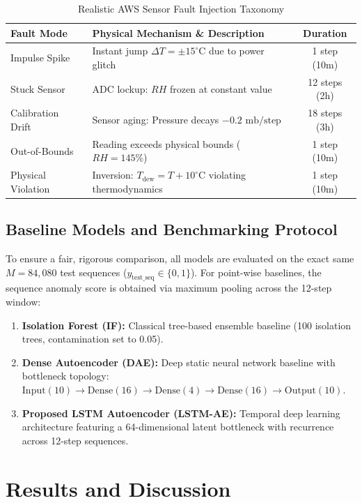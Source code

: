 \documentclass[conference]{IEEEtran}
\begin{document}
\begin{table}[htbp]
\caption{Realistic AWS Sensor Fault Injection Taxonomy}
\label{tab:fault_modes}
\centering
\begin{tabular}{lp{3.5cm}c}
\toprule
\textbf{Fault Mode} & \textbf{Physical Mechanism \& Description} & \textbf{Duration} \\
\midrule
Impulse Spike & Instant jump $\Delta T = \pm 15^\circ\text{C}$ due to power glitch & 1 step (10m) \\
Stuck Sensor & ADC lockup: $RH$ frozen at constant value & 12 steps (2h) \\
Calibration Drift & Sensor aging: Pressure decays $-0.2\text{ mb/step}$ & 18 steps (3h) \\
Out-of-Bounds & Reading exceeds physical bounds ($RH = 145\%$) & 1 step (10m) \\
Physical Violation & Inversion: $T_{\text{dew}} = T + 10^\circ\text{C}$ violating thermodynamics & 1 step (10m) \\
\bottomrule
\end{tabular}
\end{table}

\subsection{Baseline Models and Benchmarking Protocol}
To ensure a fair, rigorous comparison, all models are evaluated on the exact same $M = 84,080$ test sequences ($y_{\text{test\_seq}} \in \{0, 1\}$). For point-wise baselines, the sequence anomaly score is obtained via maximum pooling across the 12-step window:
\begin{enumerate}
    \item \textbf{Isolation Forest (IF):} Classical tree-based ensemble baseline (100 isolation trees, contamination set to 0.05).
    \item \textbf{Dense Autoencoder (DAE):} Deep static neural network baseline with bottleneck topology: $\text{Input}(10) \to \text{Dense}(16) \to \text{Dense}(4) \to \text{Dense}(16) \to \text{Output}(10)$.
    \item \textbf{Proposed LSTM Autoencoder (LSTM-AE):} Temporal deep learning architecture featuring a 64-dimensional latent bottleneck with recurrence across 12-step sequences.
\end{enumerate}

\section{Results and Discussion}
\end{document}
